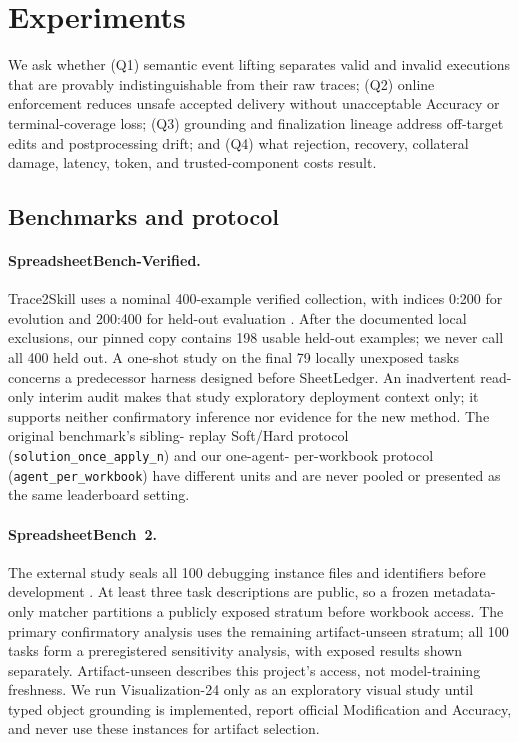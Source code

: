 \section{Experiments}
\label{sec:experiments}

We ask whether (Q1) semantic event lifting separates valid and invalid
executions that are provably indistinguishable from their raw traces; (Q2)
online enforcement reduces unsafe accepted delivery without unacceptable
Accuracy or terminal-coverage loss; (Q3) grounding and finalization lineage
address off-target edits and postprocessing drift; and (Q4) what rejection,
recovery, collateral damage, latency, token, and trusted-component costs result.



\subsection{Benchmarks and protocol}

\paragraph{SpreadsheetBench-Verified.}
Trace2Skill uses a nominal 400-example verified collection, with indices
0:200 for evolution and 200:400 for held-out evaluation
\citep{ma2024spreadsheetbench,ni2026trace2skill}. After the documented local
exclusions, our pinned copy contains 198 usable held-out examples; we never call
all 400 held out. A one-shot study on the final 79 locally unexposed tasks
concerns a predecessor harness designed before SheetLedger. An inadvertent
read-only interim audit makes that study exploratory deployment context only;
it supports neither confirmatory inference nor evidence for the new method.
The original benchmark's sibling-
replay Soft/Hard protocol (\texttt{solution\_once\_apply\_n}) and our one-agent-
per-workbook protocol (\texttt{agent\_per\_workbook}) have different units and
are never pooled or presented as the same leaderboard setting.

\paragraph{SpreadsheetBench~2.}
The external study seals all 100 debugging instance files and identifiers
before development \citep{zhu2026spreadsheetbench2}. At least three task
descriptions are public, so a frozen metadata-only matcher partitions a
publicly exposed stratum before workbook access. The primary confirmatory
analysis uses the remaining artifact-unseen stratum; all 100 tasks form a
preregistered sensitivity analysis, with exposed results shown separately.
Artifact-unseen describes this project's access, not model-training freshness.
We run Visualization-24 only as an exploratory visual study until typed object
grounding is implemented, report official Modification and Accuracy, and never
use these instances for artifact selection.

